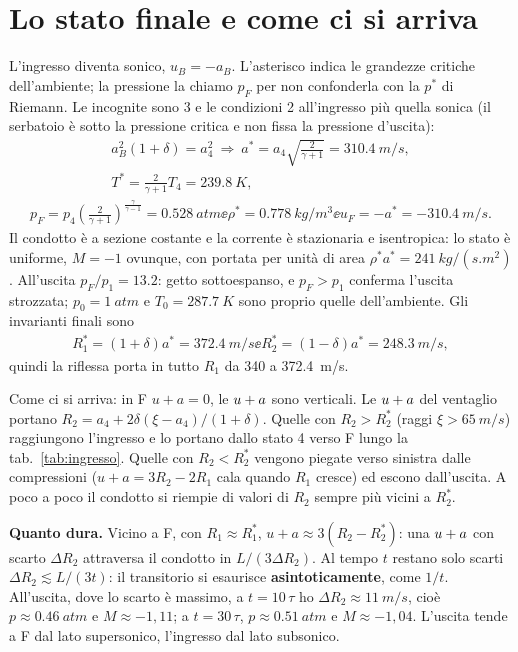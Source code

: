 \section*{Lo stato finale e come ci si arriva}
L'ingresso diventa sonico, $u_B=-a_B$. L'asterisco indica le grandezze critiche dell'ambiente; la pressione la chiamo
$p_F$ per non confonderla con la $p^*$ di Riemann. Le incognite sono 3 e le condizioni 2 all'ingresso più quella sonica
(il serbatoio è sotto la pressione critica e non fissa la pressione d'uscita):
\begin{gather*}
  a_B^2(1+\delta)=a_4^2\ \Rightarrow\ a^*=a_4\sqrt{\frac{2}{\gamma+1}}=\SI{310.4}{m/s},\\
  T^*=\frac{2}{\gamma+1}T_4=\SI{239.8}{K},
\end{gather*}
\begin{gather*}
  p_F=p_4\left(\frac{2}{\gamma+1}\right)^{\frac{\gamma}{\gamma-1}}=\SI{0.528}{atm} \ee
  \rho^*=\SI{0.778}{kg/m^3} \ee u_F=-a^*=\SI{-310.4}{m/s}.
\end{gather*}
Il condotto è a sezione costante e la corrente è stazionaria e isentropica: lo stato è uniforme, $M=-1$ ovunque, con
portata per unità di area $\rho^*a^*=\SI{241}{kg/(s.m^2)}$. All'uscita $p_F/p_1=\num{13.2}$: getto sottoespanso, e
$p_F>p_1$ conferma l'uscita strozzata; $p_0=\SI{1}{atm}$ e $T_0=\SI{287.7}{K}$ sono proprio quelle dell'ambiente.
Gli invarianti finali sono
\begin{gather*}
  R_1^*=(1+\delta)a^*=\SI{372.4}{m/s} \ee R_2^*=(1-\delta)a^*=\SI{248.3}{m/s},
\end{gather*}
quindi la riflessa porta in tutto $R_1$ da 340 a \SI{372.4}{m/s}.

Come ci si arriva: in F $u+a=0$, le $u+a$ sono verticali. Le $u+a$ del ventaglio portano
$R_2=a_4+2\delta(\xi-a_4)/(1+\delta)$. Quelle con $R_2>R_2^*$ (raggi $\xi>\SI{65}{m/s}$) raggiungono l'ingresso e lo
portano dallo stato 4 verso F lungo la tab.~\ref{tab:ingresso}. Quelle con $R_2<R_2^*$ vengono piegate verso sinistra
dalle compressioni ($u+a=3R_2-2R_1$ cala quando $R_1$ cresce) ed escono dall'uscita. A poco a poco il condotto si
riempie di valori di $R_2$ sempre più vicini a $R_2^*$.

\textbf{Quanto dura.} Vicino a F, con $R_1\approx R_1^*$, $u+a\approx3(R_2-R_2^*)$: una $u+a$ con scarto $\Delta R_2$
attraversa il condotto in $L/(3\Delta R_2)$. Al tempo $t$ restano solo scarti $\Delta R_2\lesssim L/(3t)$: il transitorio
si esaurisce \textbf{asintoticamente}, come $1/t$. All'uscita, dove lo scarto è massimo, a $t=10\,\tau$ ho
$\Delta R_2\approx\SI{11}{m/s}$, cioè $p\approx\SI{0.46}{atm}$ e $M\approx-1{,}11$; a $t=30\,\tau$, $p\approx\SI{0.51}{atm}$
e $M\approx-1{,}04$. L'uscita tende a F dal lato supersonico, l'ingresso dal lato subsonico.

